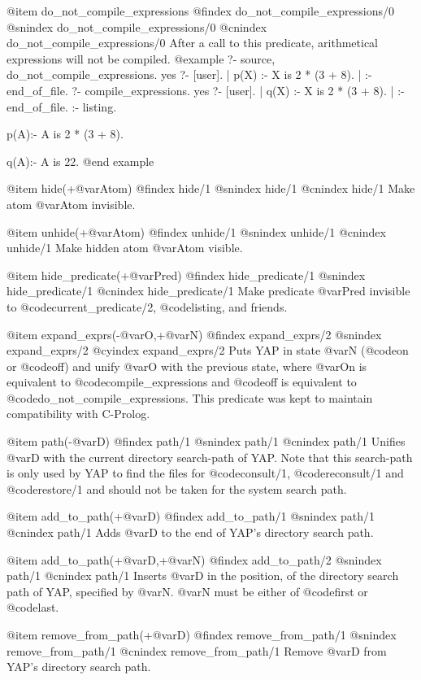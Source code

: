 {{{{@item do_not_compile_expressions
@findex do_not_compile_expressions/0
@snindex do_not_compile_expressions/0
@cnindex do_not_compile_expressions/0
After a call to this predicate, arithmetical expressions will not be compiled.
@example
?- source, do_not_compile_expressions.
yes
?- [user].
| p(X) :- X is 2 * (3 + 8).
| :- end_of_file.
?- compile_expressions.
yes
?- [user].
| q(X) :- X is 2 * (3 + 8).
| :- end_of_file.
:- listing.

p(A):-
      A is 2 * (3 + 8).

q(A):-
      A is 22.
@end example

@item hide(+@var{Atom})
@findex hide/1
@snindex hide/1
@cnindex hide/1
Make atom @var{Atom} invisible.

@item unhide(+@var{Atom})
@findex unhide/1
@snindex unhide/1
@cnindex unhide/1
Make hidden atom @var{Atom} visible.


@item hide_predicate(+@var{Pred})
@findex hide_predicate/1
@snindex hide_predicate/1
@cnindex hide_predicate/1
Make predicate @var{Pred} invisible to @code{current_predicate/2},
@code{listing}, and friends.

@item expand_exprs(-@var{O},+@var{N})
@findex expand_exprs/2
@snindex expand_exprs/2
@cyindex expand_exprs/2
Puts YAP in state @var{N} (@code{on} or @code{off}) and unify
@var{O} with the previous state, where @var{On} is equivalent to
@code{compile_expressions} and @code{off} is equivalent to
@code{do_not_compile_expressions}. This predicate was kept to maintain
compatibility with C-Prolog.

@item path(-@var{D})
@findex path/1
@snindex path/1
@cnindex path/1
Unifies @var{D} with the current directory search-path of YAP.
Note that this search-path is only used by YAP to find the
files for @code{consult/1}, @code{reconsult/1} and @code{restore/1} and
should not be taken for the system search path.

@item add_to_path(+@var{D})
@findex add_to_path/1
@snindex path/1
@cnindex path/1
Adds @var{D} to the end of YAP's directory search path.

@item add_to_path(+@var{D},+@var{N})
@findex add_to_path/2
@snindex path/1
@cnindex path/1
Inserts @var{D} in the position, of the directory search path of
YAP, specified by @var{N}.  @var{N} must be either of
@code{first} or @code{last}.

@item remove_from_path(+@var{D})
@findex remove_from_path/1
@snindex remove_from_path/1
@cnindex remove_from_path/1
Remove @var{D} from YAP's directory search path.

}}}}
